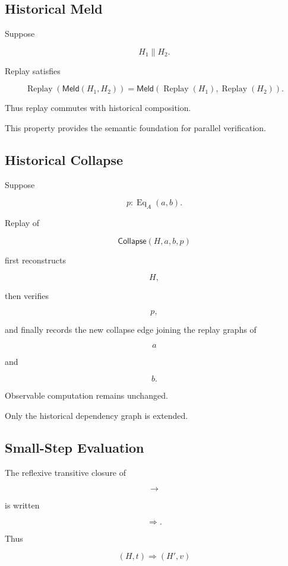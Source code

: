 \documentclass[12pt,oneside]{article}
\theoremstyle{definition}
\theoremstyle{remark}
\newcommand{\Collapse}{\mathsf{Collapse}}
\newcommand{\Meld}{\mathsf{Meld}}
\DeclareMathOperator{\Replay}{Replay}
\begin{document}
\subsection{Historical Meld}

Suppose

\[
H_1
\parallel
H_2.
\]

Replay satisfies

\[
\Replay(\Meld(H_1,H_2))
=
\Meld(
\Replay(H_1),
\Replay(H_2)
).
\]

Thus replay commutes with historical composition.

This property provides the semantic foundation for parallel verification.


\subsection{Historical Collapse}

Suppose

\[
p
:
\operatorname{Eq}_A(a,b).
\]

Replay of

\[
\Collapse(H,a,b,p)
\]

first reconstructs

\[
H,
\]

then verifies

\[
p,
\]

and finally records the new collapse edge joining the replay graphs of

\[
a
\]

and

\[
b.
\]

Observable computation remains unchanged.

Only the historical dependency graph is extended.


\subsection{Small-Step Evaluation}

The reflexive transitive closure of

\[
\longrightarrow
\]

is written

\[
\Longrightarrow.
\]

Thus

\[
(H,t)
\Longrightarrow
(H',v)
\]
\end{document}
